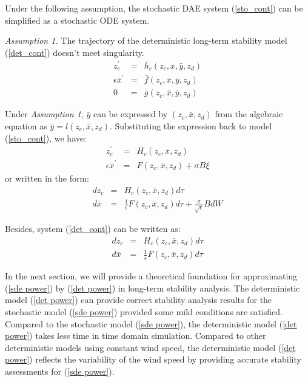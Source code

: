 \documentclass[journal]{IEEEtran}
\newcommand{\ee}{\epsilon}
\begin{document}
Under the following assumption, the stochastic DAE system (\ref{sto_cont}) can be simplified as a stochastic ODE system.

\textit{Assumption 1.}
The trajectory of the deterministic long-term stability model (\ref{det_cont}) doesn't meet singularity.
\begin{eqnarray}\label{det_cont}
{z}_{c}^\prime&=&\bar{h}_c({z_c,x,\bar{y},z_d})\\
\ee{\bar{x}}^\prime&=&\bar{f}({z_c,\bar{x},\bar{y},z_d})\nonumber\\
{0}&=&\bar{g}({z_c,\bar{x},\bar{y},z_d})\nonumber
\end{eqnarray}

Under \textit{Assumption 1}, $\bar{y}$ can be expressed by $(z_c,\bar{x},z_d)$ from the algebraic equation as $\bar{y}=l(z_c,\bar{x},z_d)$. Substituting the expression back to model (\ref{sto_cont}), we have:
\begin{eqnarray}\label{sde power dae}
z_c^\prime&=&H_c(z_c,\bar{x},z_d)\\
\ee\bar{x}^\prime&=&F(z_c,\bar{x},z_d)+\sigma B {\xi}\nonumber
\end{eqnarray}
or written in the form:
\begin{eqnarray}\label{sde power}
dz_c&=&H_c(z_c,\bar{x},z_d)d\tau\\
d\bar{x}&=&\frac{1}{\ee}F(z_c,\bar{x},z_d)d\tau+\frac{\sigma}{\sqrt{\ee}}BdW\nonumber
\end{eqnarray}

Besides, system (\ref{det_cont}) can be written as:
\begin{eqnarray}\label{det power}
dz_c&=&H_c(z_c,\bar{x},z_d)d\tau\\
d\bar{x}&=&\frac{1}{\ee}F(z_c,\bar{x},z_d)d\tau\nonumber
\end{eqnarray}

In the next section, we will provide a theoretical foundation for approximating (\ref{sde power}) by (\ref{det power}) in long-term stability analysis. The deterministic model (\ref{det power}) can provide correct stability analysis results for the stochastic model (\ref{sde power}) provided some mild conditions are satisfied. Compared to the stochastic model (\ref{sde power}), the deterministic model (\ref{det power}) takes less time in time domain simulation. Compared to other deterministic models using constant wind speed, the deterministic model (\ref{det power}) reflects the variability of the wind speed by providing accurate stability assessments for (\ref{sde power}). 
\end{document}
